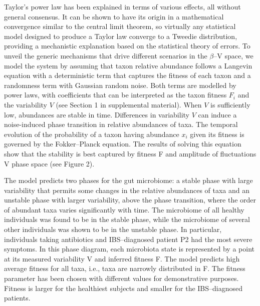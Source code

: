 Taylor's power law has been explained in terms of various effects, all without general consensus. It can be shown to have its origin in a mathematical convergence similar to the central limit theorem, so virtually any statistical model designed to produce a Taylor law converge to a Tweedie distribution\cite{stat}, providing a mechanistic explanation based on the statistical theory of errors\cite{convergence1,convergence2,convergence3}. To unveil the generic mechanisms that drive different scenarios in the $\beta$--V space, we model the system by assuming that taxon relative abundance follows a Langevin equation with a deterministic term that captures the fitness of each taxon and a randomness term with Gaussian random noise\cite{ranking}. Both terms are modelled by power laws, with coefficients that can be interpreted as the taxon fitness $F_i$ and the variability $V$ (see Section 1 in supplemental material). When $V$ is sufficiently low, abundances are stable in time.  Differences in variability $V$ can induce a noise-induced phase transition in relative abundances of taxa. The temporal evolution of the probability of a taxon having abundance $x_i$ given its fitness is governed by the Fokker--Planck equation. The results of solving this equation show that  the stability is best captured by fitness F and amplitude of fluctuations V phase space (see Figure 2). 

The model predicts two phases for the gut microbiome: a stable phase with large variability that permits some changes in the relative abundances of taxa and an unstable phase with larger variability, above the phase transition, where the order of abundant taxa varies significantly with time. The microbiome of all healthy individuals was found to be in the stable phase, while the microbiome of several other individuals was shown to be in the unstable phase. In particular, individuals taking antibiotics and IBS--diagnosed patient P2 had the most severe symptoms. In this phase diagram, each microbiota state is represented by a point at its measured variability V and inferred fitness F. The model predicts high average fitness for all taxa, i.e., taxa are narrowly distributed in F. The fitness parameter has been chosen with different values for demonstrative purposes. Fitness is larger for the healthiest subjects and smaller for the IBS--diagnosed patients.  
